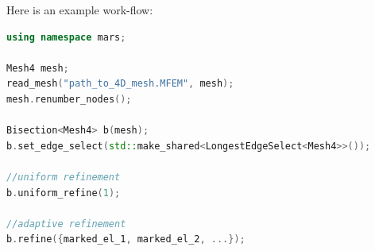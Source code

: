 \documentclass{article}
\begin{document}
Here is an example work-flow:

\begin{lstlisting}[language=C++, caption={Example refinement code}]
using namespace mars;

Mesh4 mesh;
read_mesh("path_to_4D_mesh.MFEM", mesh);
mesh.renumber_nodes();

Bisection<Mesh4> b(mesh);
b.set_edge_select(std::make_shared<LongestEdgeSelect<Mesh4>>());

//uniform refinement
b.uniform_refine(1);

//adaptive refinement
b.refine({marked_el_1, marked_el_2, ...});
\end{lstlisting}
\end{document}
